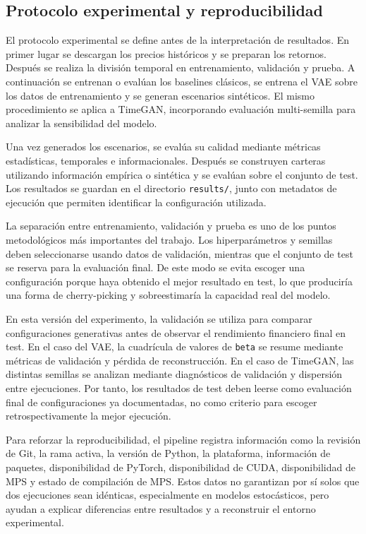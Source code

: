 \documentclass[11pt,a4paper,spanish,oneside]{book}
\numberwithin{equation}{chapter}
\numberwithin{figure}{chapter}
\begin{document}
\subsection{Protocolo experimental y reproducibilidad}

El protocolo experimental se define antes de la interpretación de resultados. En primer lugar se descargan los precios históricos y se preparan los retornos. Después se realiza la división temporal en entrenamiento, validación y prueba. A continuación se entrenan o evalúan los baselines clásicos, se entrena el VAE sobre los datos de entrenamiento y se generan escenarios sintéticos. El mismo procedimiento se aplica a TimeGAN, incorporando evaluación multi-semilla para analizar la sensibilidad del modelo.

Una vez generados los escenarios, se evalúa su calidad mediante métricas estadísticas, temporales e informacionales. Después se construyen carteras utilizando información empírica o sintética y se evalúan sobre el conjunto de test. Los resultados se guardan en el directorio \texttt{results/}, junto con metadatos de ejecución que permiten identificar la configuración utilizada.

La separación entre entrenamiento, validación y prueba es uno de los puntos metodológicos más importantes del trabajo. Los hiperparámetros y semillas deben seleccionarse usando datos de validación, mientras que el conjunto de test se reserva para la evaluación final. De este modo se evita escoger una configuración porque haya obtenido el mejor resultado en test, lo que produciría una forma de cherry-picking y sobreestimaría la capacidad real del modelo.

En esta versión del experimento, la validación se utiliza para comparar configuraciones generativas antes de observar el rendimiento financiero final en test. En el caso del VAE, la cuadrícula de valores de \texttt{beta} se resume mediante métricas de validación y pérdida de reconstrucción. En el caso de TimeGAN, las distintas semillas se analizan mediante diagnósticos de validación y dispersión entre ejecuciones. Por tanto, los resultados de test deben leerse como evaluación final de configuraciones ya documentadas, no como criterio para escoger retrospectivamente la mejor ejecución.

Para reforzar la reproducibilidad, el pipeline registra información como la revisión de Git, la rama activa, la versión de Python, la plataforma, información de paquetes, disponibilidad de PyTorch, disponibilidad de CUDA, disponibilidad de MPS y estado de compilación de MPS. Estos datos no garantizan por sí solos que dos ejecuciones sean idénticas, especialmente en modelos estocásticos, pero ayudan a explicar diferencias entre resultados y a reconstruir el entorno experimental.
\end{document}
